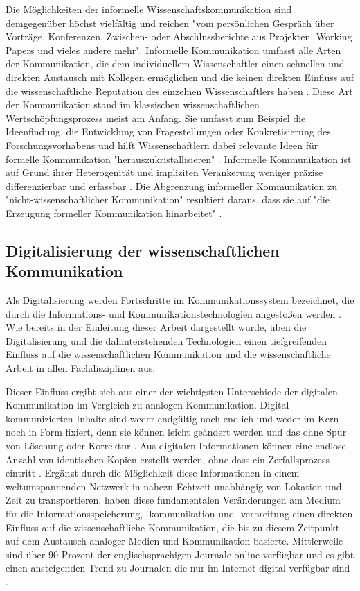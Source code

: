 Die Möglichkeiten der informelle Wissenschaftskommunikation sind demgegenüber höchst vielfältig und reichen "vom persönlichen Gespräch über Vorträge, Konferenzen, Zwischen- oder Abschlussberichte aus Projekten, Working Papers und vieles andere mehr"\cite{Hanekop_2014}. Informelle Kommunikation umfasst alle Arten der Kommunikation, die dem individuellem Wissenschaftler einen schnellen und direkten Austausch mit Kollegen ermöglichen und die keinen direkten Einfluss auf die wissenschaftliche Reputation des einzelnen Wissenschaftlers haben \cite{suchen}. Diese Art der Kommunikation stand im klassischen wissenschaftlichen Wertschöpfungsprozess meist am Anfang. Sie umfasst zum Beispiel die Ideenfindung, die Entwicklung von Fragestellungen oder Konkretisierung des Forschungsvorhabens und hilft Wissenschaftlern dabei relevante Ideen für formelle Kommunikation "herauszukristallisieren" \cite{Hanekop_2014}. Informelle Kommunikation ist auf Grund ihrer Heterogenität und impliziten Verankerung weniger präzise differenzierbar und erfassbar \cite{kaden_2009_library}. Die Abgrenzung informeller Kommunikation zu "nicht-wissenschaftlicher Kommunikation" resultiert daraus, dass sie auf "die Erzeugung formeller Kommunikation hinarbeitet" \cite{kaden_2009_library}.

\subsection{Digitalisierung der wissenschaftlichen Kommunikation}

Als Digitalisierung werden Fortschritte im Kommunikationssystem bezeichnet, die durch die Informations- und Kommunikationstechnologien angestoßen werden \cite{bbaw_publizieren_2015}. Wie bereits in der Einleitung dieser Arbeit dargestellt wurde, üben die Digitalisierung und die dahinterstehenden Technologien einen tiefgreifenden Einfluss auf die wissenschaftlichen Kommunikation und die wissenschaftliche Arbeit in allen Fachdisziplinen aus.

Dieser Einfluss ergibt sich aus einer der wichtigsten Unterschiede der digitalen Kommunikation im Vergleich zu analogen Kommunikation. Digital kommunizierten Inhalte sind weder endgültig noch endlich und weder im Kern noch in Form fixiert, denn sie können leicht geändert werden und das ohne Spur von Löschung oder Korrektur \cite{smith_1999_digitize}. Aus digitalen Informationen können eine endlose Anzahl von identischen Kopien erstellt werden, ohne dass ein Zerfallsprozess eintritt \cite{smith_1999_digitize}. Ergänzt durch die Möglichkeit diese Informationen in einem weltumspannenden Netzwerk in nahezu Echtzeit unabhängig von Lokation und Zeit zu transportieren, haben diese fundamentalen Veränderungen am Medium für die Informationsspeicherung, -kommunikation und -verbreitung einen direkten Einfluss auf die wissenschaftliche Kommunikation, die bis zu diesem Zeitpunkt auf dem Austausch analoger Medien und Kommunikation basierte. Mittlerweile sind über 90 Prozent der englischsprachigen Journale online verfügbar und es gibt einen ansteigenden Trend zu Journalen die nur im Internet digital verfügbar sind \cite{cope2014future}.

